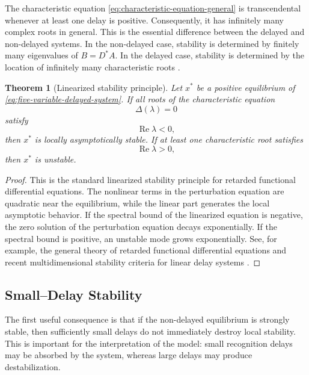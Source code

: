 \documentclass[11pt]{article}
\newtheorem{theorem}{Theorem}
\begin{document}
 The characteristic equation \eqref{eq:characteristic-equation-general} is
 transcendental whenever at least one delay is positive. Consequently, it has
 infinitely many complex roots in general. This is the essential difference
 between the delayed and non-delayed systems. In the non-delayed case, stability
 is determined by finitely many eigenvalues of $B=D^\ast A$. In the delayed
 case, stability is determined by the location of infinitely many characteristic
 roots \cite{hale1993introduction,fukuda2022stability}.
 
 \begin{theorem}[Linearized stability principle]
 	\label{thm:linearized-stability-principle}
 	Let $x^\ast$ be a positive equilibrium of
 	\eqref{eq:five-variable-delayed-system}. If all roots of the characteristic equation
 	\[
 	\Delta(\lambda)=0
 	\]
 	satisfy
 	\[
 	\operatorname{Re}\lambda<0,
 	\]
 	then $x^\ast$ is locally asymptotically stable. If at least one characteristic
 	root satisfies
 	\[
 	\operatorname{Re}\lambda>0,
 	\]
 	then $x^\ast$ is unstable.
 \end{theorem}
 
 \begin{proof}
 	This is the standard linearized stability principle for retarded functional
 	differential equations. The nonlinear terms in the perturbation equation are
 	quadratic near the equilibrium, while the linear part generates the local
 	asymptotic behavior. If the spectral bound of the linearized equation is
 	negative, the zero solution of the perturbation equation decays exponentially.
 	If the spectral bound is positive, an unstable mode grows exponentially. See,
 	for example, the general theory of retarded functional differential equations
 	\cite{hale1993introduction} and recent multidimensional stability criteria for
 	linear delay systems \cite{fukuda2022stability}.
 \end{proof}
 
 \subsection{Small--Delay Stability}
 
 The first useful consequence is that if the non-delayed equilibrium is strongly
 stable, then sufficiently small delays do not immediately destroy local
 stability. This is important for the interpretation of the model: small
 recognition delays may be absorbed by the system, whereas large delays may
 produce destabilization.
 
\end{document}
